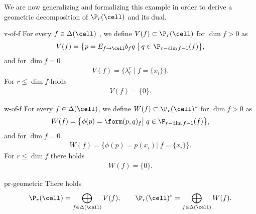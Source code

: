 We are now generalizing and formalizing this example in order to
derive a geometric decomposition of $\P_r(\cell)$ and its dual.

\begin{Definition}{v-of-f}
  For every $f\in\Delta(\cell)$%
  , we define
  $V(f) \subset \P_r(\cell)$  for $\dim f>0$ as
  \begin{gather}
    V(f) = \bigl\{ p = E_{f\to\cell} b_f q
    \;\big\vert\;
    q \in \P_{r-\dim f -1}(f) \bigr\},
  \end{gather}
  and for $\dim f=0$
  \begin{gather}
    V(f) = \bigl\{ \lambda_i^r
    \;\big\vert\;
    f = \{x_i\}\bigr\}.
  \end{gather}
  For $r\le \dim f$ holds
  \begin{gather}
    V(f) = \{0\}.
  \end{gather}
\end{Definition}

\begin{Definition}{w-of-f}
  For every $f\in\Delta(\cell)$, we define
  $W(f) \subset \P_r(\cell)^*$ for $\dim f>0$ as
  \begin{gather}
    W(f) = \bigl\{\phi(p) = \form(p,q)_f\big\vert
    \;q\in\P_{r-\dim f-1}(f) \bigr\},
  \end{gather}
  and for $\dim f=0$
  \begin{gather}
    W(f) = \bigl\{\phi(p)= p(x_i) \big|
    \;f=\{x_i\}
    \bigr\}.
  \end{gather}
  For $r \le \dim f$ there holds
  \begin{gather}
    W(f) = \{0\}.
  \end{gather}
\end{Definition}

\begin{Lemma}{pr-geometric}
  There holds
  \begin{gather}
    \P_r(\cell) = \bigoplus_{f\in\Delta(\cell)}V(f),
    \qquad
    \P_r(\cell)^* = \bigoplus_{f\in\Delta(\cell)}W(f).
  \end{gather}
\end{Lemma}

